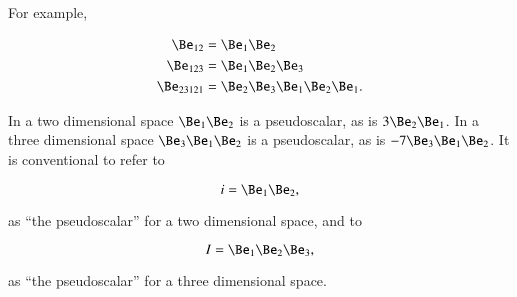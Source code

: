 
For example,

\begin{equation}\label{eqn:multivector:360}
\begin{aligned}
\Be_{12} &= \Be_1 \Be_2 \\
\Be_{123} &= \Be_1 \Be_2 \Be_3 \\
\Be_{23121} &= \Be_2 \Be_3 \Be_1 \Be_2 \Be_1.
\end{aligned}
\end{equation}


In a two dimensional space \( \Be_1 \Be_2 \) is a pseudoscalar, as is \( 3 \Be_2 \Be_1 \).  In a three dimensional space
\( \Be_3 \Be_1 \Be_2 \) is a pseudoscalar, as is \( - 7 \Be_3 \Be_1 \Be_2 \).
It is conventional to refer to

\begin{dmath}\label{eqn:definitions:320}
i = \Be_1 \Be_2,
\end{dmath}

as ``the pseudoscalar'' for a two dimensional space, and to

\begin{dmath}\label{eqn:definitions:340}
I = \Be_1 \Be_2 \Be_3,
\end{dmath}

as ``the pseudoscalar'' for a three dimensional space.


